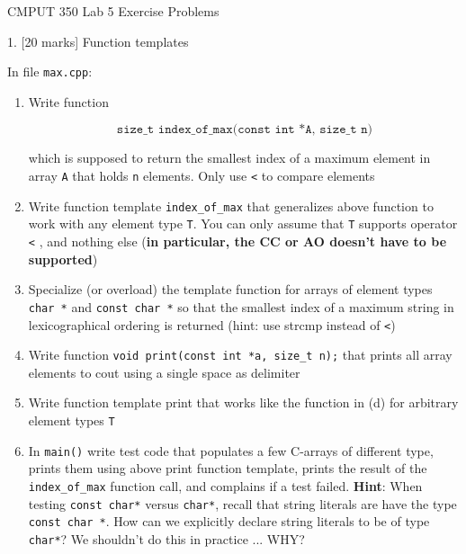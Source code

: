 \documentclass[a4paper,11pt]{article}
\begin{document}

\begin{center}
{\Large CMPUT 350 Lab 5 Exercise Problems}
\end{center}



1. [20 marks] Function templates

\bigskip 

In file \texttt{max.cpp}:
\begin{enumerate}[label=\alph*)]
\item Write function

    \[ \texttt{size\_t index\_of\_max(const int *A, size\_t n)} \]

    which is supposed to return the smallest index of a maximum element in
    array \texttt{A} that holds \texttt{n} elements. Only use \texttt{<} to compare elements

\item Write function template \texttt{index\_of\_max} that generalizes above function to work
    with any element type \texttt{T}. You can only assume that \texttt{T} supports operator \texttt{<} ,
    and nothing else (\textbf{in particular, the CC or AO doesn't have to be supported})

\item Specialize (or overload) the template function for arrays of element types \texttt{char *} and
    \texttt{const char *} so that the smallest index of a maximum string in
    lexicographical ordering is returned (hint: use strcmp instead of \texttt{<})

\item Write function \texttt{void print(const int *a, size\_t n);} that prints
    all array elements to cout using a single space as delimiter

\item Write function template print that works like the function in (d) for
    arbitrary element types \texttt{T}

\item In \texttt{main()} write test code that populates a few C-arrays of different type,
    prints them using above print function template, prints the result of the
    \texttt{index\_of\_max} function call, and complains if a test failed.
    \textbf{Hint}: When testing \texttt{const char*} versus \texttt{char*},
    recall that string literals are have the type \texttt{const char *}.
    How can we explicitly declare string literals to be of type \texttt{char*}?
    We shouldn't do this in practice ... WHY?
\end{enumerate}
\end{document}
